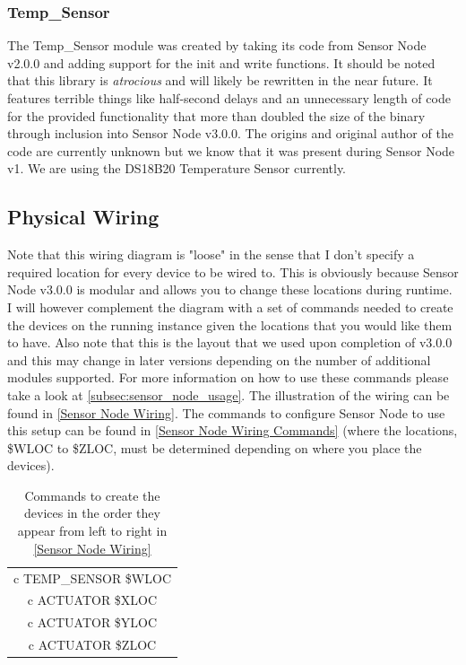 \documentclass{article}
\begin{document}
\subsubsection{Temp\_Sensor}

The Temp\_Sensor module was created by taking its code from Sensor Node v2.0.0 and adding support for the init and write functions. It should be noted that this library is \textit{atrocious} and will likely be rewritten in the near future. It features terrible things like half-second delays and an unnecessary length of code for the provided functionality that more than doubled the size of the binary through inclusion into Sensor Node v3.0.0. The origins and original author of the code are currently unknown but we know that it was present during Sensor Node v1. We are using the DS18B20 Temperature Sensor currently.

\subsection{Physical Wiring}
\label{subsec:sensor_node_wiring}

Note that this wiring diagram is "loose" in the sense that I don't specify a required location for every device to be wired to. This is obviously because Sensor Node v3.0.0 is modular and allows you to change these locations during runtime. I will however complement the diagram with a set of commands needed to create the devices on the running instance given the locations that you would like them to have. Also note that this is the layout that we used upon completion of v3.0.0 and this may change in later versions depending on the number of additional modules supported. For more information on how to use these commands please take a look at \autoref{subsec:sensor_node_usage}. The illustration of the wiring can be found in \autoref{Sensor Node Wiring}. The commands to configure Sensor Node to use this setup can be found in \autoref{Sensor Node Wiring Commands} (where the locations, \$WLOC to \$ZLOC, must be determined depending on where you place the devices).

\begin{table}[h!]
    \centering
        \begin{tabular}{|c|}
            \hline
            c TEMP\_SENSOR \$WLOC\\
            c ACTUATOR \$XLOC\\
            c ACTUATOR \$YLOC\\
            c ACTUATOR \$ZLOC\\\hline
        \end{tabular}
        \caption{Commands to create the devices in the order they appear from left to right in \autoref{Sensor Node Wiring}}
        \label{Sensor Node Wiring Commands}
\end{table}
\end{document}
